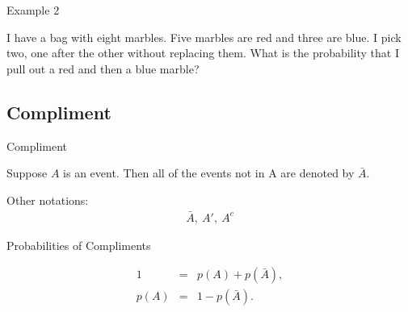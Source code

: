 \begin{frame}{Example 2}

  I have a bag with eight marbles. Five marbles are red and three are
  blue. I pick two, one after the other without replacing them. What
  is the probability that I pull out a red and then a blue marble?
  
\end{frame}

\subsection{Compliment}

\begin{frame}{Compliment}

  \begin{definition}
    Suppose $A$ is an event. Then all of the events not in A are denoted
    by $\bar{A}$. 

    Other notations:
    \begin{eqnarray*}
      \bar{A},~A',~A^c
    \end{eqnarray*}
  \end{definition}


\end{frame}


\begin{frame}{Probabilities of Compliments}
  
  \begin{eqnarray*}
    1 & = & p(A) + p(\bar{A}), \\
    p(A) & = & 1 - p(\bar{A}).
  \end{eqnarray*}

\end{frame}


